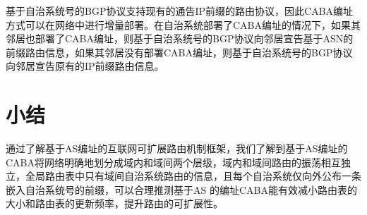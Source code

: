 基于自治系统号的BGP协议支持现有的通告IP前缀的路由协议，因此CABA编址方式可以在网络中进行增量部署。在自治系统部署了CABA编址的情况下，如果其邻居也部署了CABA编址，则基于自治系统号的BGP协议向邻居宣告基于ASN的前缀路由信息，如果其邻居没有部署CABA编址，则基于自治系统号的BGP协议向邻居宣告原有的IP前缀路由信息。

\section{小结}
通过了解基于AS编址的互联网可扩展路由机制框架，我们了解到基于AS编址的CABA将网络明确地划分成域内和域间两个层级，域内和域间路由的振荡相互独立，全局路由表中只有域间自治系统路由的信息，且每个自治系统仅向外公布一条嵌入自治系统号的前缀，可以合理推测基于AS 的编址CABA能有效减小路由表的大小和路由表的更新频率，提升路由的可扩展性。

